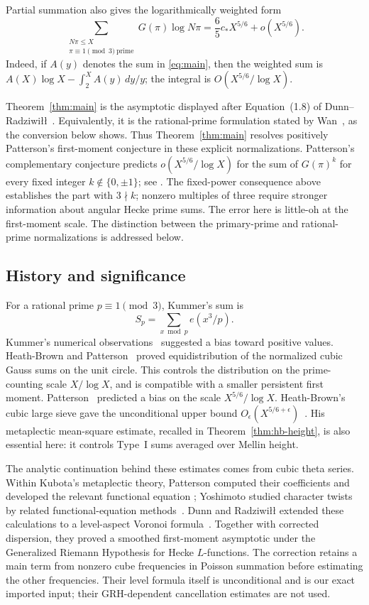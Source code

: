 \documentclass[11pt]{article}
\theoremstyle{definition}
\theoremstyle{remark}
\numberwithin{equation}{section}
\begin{document}
Partial summation also gives the logarithmically weighted form
\begin{equation}\label{eq:log-weighted-main}
 \sum_{\substack{N\pi\le X\\\pi\equiv1\pmod3\ \mathrm{prime}}}
       G(\pi)\log N\pi
 =\frac65c_*X^{5/6}+o(X^{5/6}).
\end{equation}
Indeed, if $A(y)$ denotes the sum in \eqref{eq:main}, then the weighted
sum is $A(X)\log X-\int_2^X A(y)\,dy/y$; the integral is
$O(X^{5/6}/\log X)$.

Theorem~\ref{thm:main} is the asymptotic displayed after Equation~(1.8) of
Dunn--Radziwi\l\l~\cite{DR2024}. Equivalently, it is the
rational-prime formulation stated by Wan~\cite[Conjecture~4.13]{Wan2021},
as the conversion below shows. Thus Theorem~\ref{thm:main}
resolves positively Patterson's first-moment conjecture in these
explicit normalizations. Patterson's complementary conjecture predicts
$o(X^{5/6}/\log X)$ for the sum of $G(\pi)^k$ for every fixed integer
$k\notin\{0,\pm1\}$; see \cite[Equation (1.9)]{DR2024}.
The fixed-power consequence above establishes the part with $3\nmid k$;
nonzero multiples of three require stronger information about angular
Hecke prime sums. The error here is little-oh at the first-moment
scale. The distinction between the primary-prime and rational-prime
normalizations is addressed below.

\subsection{History and significance}
For a rational prime $p\equiv1\pmod3$, Kummer's sum is
\[
 S_p=\sum_{x\bmod p}e(x^3/p).
\]
Kummer's numerical observations~\cite{Kummer1846} suggested a bias
toward positive values. Heath-Brown and Patterson~\cite{HBP1979}
proved equidistribution of the normalized cubic Gauss sums on the unit
circle. This controls the
distribution on the prime-counting scale $X/\log X$, and is compatible
with a smaller persistent first moment. Patterson~\cite{Patterson1978}
predicted a bias on the scale $X^{5/6}/\log X$. Heath-Brown's cubic
large sieve gave the unconditional upper bound
$O_\epsilon(X^{5/6+\epsilon})$~\cite{HB2000}. His metaplectic
mean-square estimate, recalled in Theorem~\ref{thm:hb-height}, is
also essential here: it controls Type~I sums averaged over Mellin height.

The analytic continuation behind these estimates comes from cubic
theta series. Within Kubota's metaplectic theory, Patterson computed
their coefficients and developed the relevant functional equation
\cite{Patterson1977}; Yoshimoto studied character twists by related
functional-equation methods~\cite{Yoshimoto1987}.
Dunn and Radziwi\l\l{} extended these calculations to a level-aspect
Voronoi formula~\cite[Section 1.3 and Proposition 5.3]{DR2024}.
Together with corrected dispersion, they proved a smoothed first-moment
asymptotic under the Generalized Riemann Hypothesis for Hecke
$L$-functions. The correction retains a main term from nonzero cube
frequencies in Poisson summation before estimating the other frequencies.
Their level formula itself is unconditional and is our exact imported
input; their GRH-dependent cancellation estimates are not used.
\end{document}

